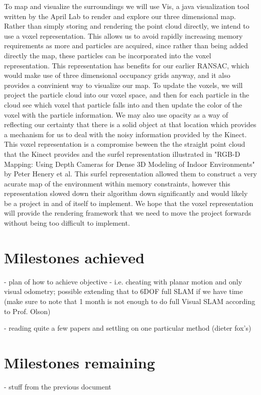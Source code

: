 \documentclass[12pt]{article}
\begin{document}
	To map and visualize the surroundings we will use Vis, a java visualization tool written by the April Lab to render and explore our three dimensional map.   Rather than simply storing and rendering the point cloud directly, we intend to use a voxel representation.  This allows us to avoid rapidly increasing memory requirements as more and particles are acquired, since rather than being added directly the map, these particles can be incorporated into the voxel representation.  This representation has benefits for our earlier RANSAC, which would make use of three dimensional occupancy grids anyway, and it also provides a convinient way to visualize our map.  To update the voxels, we will project the particle cloud into our voxel space, and then for each particle in the cloud see which voxel that particle falls into and then update the color of the voxel with the particle information.  We may also use opacity as a way of reflecting our certainty that there is a solid object at that location which provides a mechanism for us to deal with the noisy information provided by the Kinect.  This voxel representation is a compromise beween the the straight point cloud that the Kinect provides and the surfel representation illustrated in "RGB-D Mapping: Using Depth Cameras for Dense 3D Modeling of Indoor Environments" by Peter Henery et al. This surfel representation allowed them to construct a very acurate map of the environment within memory constraints, however this representation slowed down their algorithm down significantly and would likely be a project in and of itself to implement.  We hope that the voxel representation will provide the rendering framework that we need to move the project forwards without being too difficult to implement. 


\section{Milestones achieved}
- plan of how to achieve objective - i.e. cheating with planar motion and only visual odometry; possible extending that to 6DOF full SLAM if we have time (make sure to note that 1 month is not enough to do full Visual SLAM according to Prof. Olson)

- reading quite a few papers and settling on one particular method (dieter fox's)

\section{Milestones remaining}
- stuff from the previous document
\end{document}
